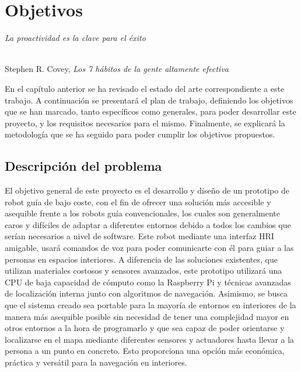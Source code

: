 \chapter{Objetivos}
\label{cap:capitulo3}

\begin{flushright}
\begin{minipage}[]{10cm}
\emph{La proactividad es la clave para el éxito}\\
\end{minipage}\\

Stephen R. Covey, \textit{Los 7 hábitos de la gente altamente efectiva}\\
\end{flushright}

\vspace{1cm}

En el capítulo anterior se ha revisado el estado del arte correspondiente a este trabajo. A continuación se presentará el plan de trabajo, definiendo los 
objetivos que se han marcado, tanto específicos como generales, para poder desarrollar este proyecto, y los requisitos necesarios para el mismo.
Finalmente, se explicará la metodología que se ha seguido para poder cumplir los objetivos propuestos.\\



\section{Descripción del problema}
\label{sec:descripcion}

\vspace{0.7cm}
El objetivo general de este proyecto es el desarrollo y diseño de un prototipo de robot guía de bajo coste, con el fin de ofrecer una solución más accesible y asequible frente a los robots guía convencionales, los cuales son generalmente caros y difíciles de adaptar a diferentes entornos debido a todos los cambios que serían necesarios a nivel de software. Este robot mediante una interfaz HRI amigable, usará comandos de voz para poder comunicarte con él para guiar a las personas en espacios interiores. A diferencia de las soluciones existentes, que utilizan materiales costosos y sensores avanzados, este prototipo utilizará una CPU de baja capacidad de cómputo como la Raspberry Pi y técnicas avanzadas de localización interna  junto con algoritmos de navegación. Asimismo, se busca que el sistema creado sea portable para la mayoría de entornos en interiores de la manera más asequible posible sin necesidad de 
tener una complejidad mayor en otros entornos a la hora de programarlo y que sea capaz de poder orientarse y localizarse en el mapa mediante diferentes sensores y actuadores hasta llevar a la persona a un punto en concreto. Esto proporciona una opción más económica, práctica y versátil para la navegación en interiores.\\ 

